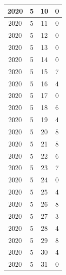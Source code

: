 \begin{longtable} {|c|c|c|c|}
\hline
2020         & 5            & 10           & 0                         \\ 
\hline
2020         & 5            & 11           & 0                         \\ 
\hline
2020         & 5            & 12           & 0                         \\ 
\hline
2020         & 5            & 13           & 0                         \\ 
\hline
2020         & 5            & 14           & 0                         \\ 
\hline
2020         & 5            & 15           & 7                         \\ 
\hline
2020         & 5            & 16           & 4                         \\ 
\hline
2020         & 5            & 17           & 0                         \\ 
\hline
2020         & 5            & 18           & 6                         \\ 
\hline
2020         & 5            & 19           & 4                         \\ 
\hline
2020         & 5            & 20           & 8                         \\ 
\hline
2020         & 5            & 21           & 8                         \\ 
\hline
2020         & 5            & 22           & 6                         \\ 
\hline
2020         & 5            & 23           & 7                         \\ 
\hline
2020         & 5            & 24           & 0                         \\ 
\hline
2020         & 5            & 25           & 4                         \\ 
\hline
2020         & 5            & 26           & 8                         \\ 
\hline
2020         & 5            & 27           & 3                         \\ 
\hline
2020         & 5            & 28           & 4                         \\ 
\hline
2020         & 5            & 29           & 8                         \\ 
\hline
2020         & 5            & 30           & 4                         \\ 
\hline
2020         & 5            & 31           & 0                         \\ 

\end{longtable}
